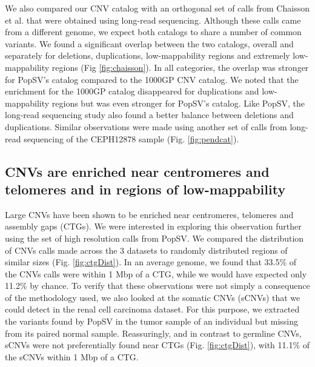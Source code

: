 We also compared our CNV catalog with an orthogonal set of calls from Chaisson et al.\cite{Chaisson2014} that were obtained using long-read sequencing.
Although these calls came from a different genome, we expect both catalogs to share a number of common variants.
We found a significant overlap between the two catalogs, overall and separately for deletions, duplications, low-mappability regions and extremely low-mappability regions (Fig \ref{fig:chaisson}).
In all categories, the overlap was stronger for {\sf PopSV}'s catalog compared to the 1000GP CNV catalog.
We noted that the enrichment for the 1000GP catalog disappeared for duplications and low-mappability regions but was even stronger for {\sf PopSV}'s catalog.
Like {\sf PopSV}, the long-read sequencing study\cite{Chaisson2014} also found a better balance between deletions and duplications.
Similar observations were made using another set of calls from long-read sequencing of the CEPH12878 sample\cite{Pendleton2015} (Fig. \ref{fig:pendcat}).

\subsection*{CNVs are enriched near centromeres and telomeres and in regions of low-mappability}

Large CNVs have been shown to be enriched near centromeres, telomeres and assembly gaps (CTGs)\cite{Nguyen2006}.
We were interested in exploring this observation further using the set of high resolution calls from {\sf PopSV}.
We compared the distribution of CNVs calls made across the 3 datasets to randomly distributed regions of similar sizes (Fig. \ref{fig:ctgDist}).
In an average genome, we found that 33.5\% of the CNVs calls were within 1 Mbp of a CTG, while we would have expected only 11.2\% by chance.
To verify that these observations were not simply a consequence of the methodology used, we also looked at the somatic CNVs (sCNVs) that we could detect in the renal cell carcinoma dataset.
For this purpose, we extracted the variants found by {\sf PopSV} in the tumor sample of an individual but missing from its paired normal sample.
Reassuringly, and in contrast to germline CNVs, sCNVs were not preferentially found near CTGs (Fig. \ref{fig:ctgDist}), with 11.1\% of the sCNVs within 1 Mbp of a CTG.

